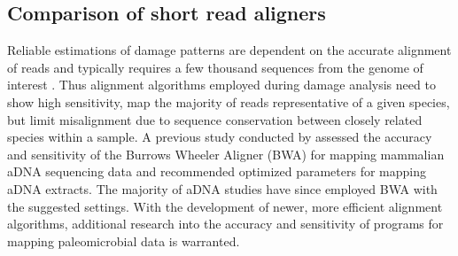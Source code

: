 \documentclass[12pt, a4paper]{article}
\begin{document}
%


\subsection{Comparison of short read aligners}

Reliable estimations of damage patterns are dependent on the accurate alignment of reads and typically requires a few thousand sequences from the genome of interest \cite{Warinner:2017aa}.
Thus alignment algorithms employed during damage analysis need to show high sensitivity, map the majority of reads representative of a given species, but limit misalignment due to sequence conservation between closely related species within a sample.
A previous study conducted by \cite{Schubert:2012aa}  assessed the accuracy and sensitivity of the Burrows Wheeler Aligner (BWA) for mapping mammalian aDNA sequencing data and recommended optimized parameters for mapping aDNA extracts. The majority of aDNA studies have since employed BWA with the suggested settings.
With the development of newer, more efficient alignment algorithms, additional research into the accuracy and sensitivity of programs for mapping paleomicrobial data is warranted.
\end{document}
